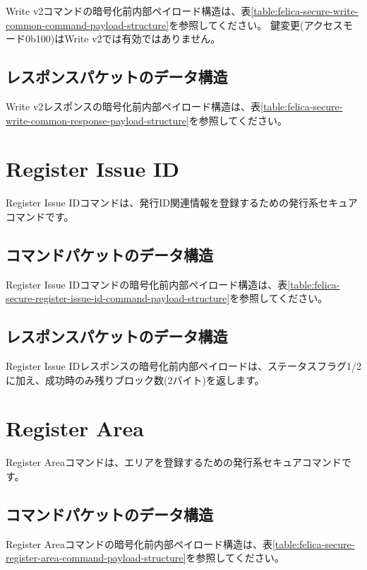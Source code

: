 \documentclass[a4paper]{report}
\begin{document}
Write v2コマンドの暗号化前内部ペイロード構造は、表\ref{table:felica-secure-write-common-command-payload-structure}を参照してください。
鍵変更(アクセスモード0b100)はWrite v2では有効ではありません。

\subsection{レスポンスパケットのデータ構造}

Write v2レスポンスの暗号化前内部ペイロード構造は、表\ref{table:felica-secure-write-common-response-payload-structure}を参照してください。

\section{Register Issue ID}

Register Issue IDコマンドは、発行ID関連情報を登録するための発行系セキュアコマンドです。

\subsection{コマンドパケットのデータ構造}

Register Issue IDコマンドの暗号化前内部ペイロード構造は、表\ref{table:felica-secure-register-issue-id-command-payload-structure}を参照してください。

\subsection{レスポンスパケットのデータ構造}

Register Issue IDレスポンスの暗号化前内部ペイロードは、ステータスフラグ1/2に加え、成功時のみ残りブロック数(2バイト)を返します。

\section{Register Area}

Register Areaコマンドは、エリアを登録するための発行系セキュアコマンドです。

\subsection{コマンドパケットのデータ構造}

Register Areaコマンドの暗号化前内部ペイロード構造は、表\ref{table:felica-secure-register-area-command-payload-structure}を参照してください。
\end{document}
